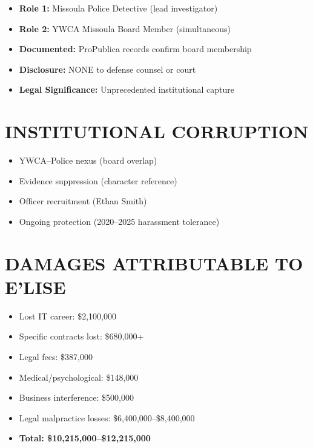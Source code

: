 \documentclass[12pt,oneside]{article}
\begin{document}
\begin{itemize}

\item \textbf{Role 1:} Missoula Police Detective (lead investigator)

\item \textbf{Role 2:} YWCA Missoula Board Member (simultaneous)

\item \textbf{Documented:} ProPublica records confirm board membership

\item \textbf{Disclosure:} NONE to defense counsel or court

\item \textbf{Legal Significance:} Unprecedented institutional capture

\end{itemize}

\section*{INSTITUTIONAL CORRUPTION}

\begin{itemize}

\item YWCA--Police nexus (board overlap)

\item Evidence suppression (character reference)

\item Officer recruitment (Ethan Smith)

\item Ongoing protection (2020--2025 harassment tolerance)

\end{itemize}

\section*{DAMAGES ATTRIBUTABLE TO E'LISE}

\begin{itemize}

\item Lost IT career: \$2,100,000

\item Specific contracts lost: \$680,000+

\item Legal fees: \$387,000

\item Medical/psychological: \$148,000

\item Business interference: \$500,000

\item Legal malpractice losses: \$6,400,000--\$8,400,000

\item \textbf{Total: \$10,215,000--\$12,215,000}

\end{itemize}
\end{document}
